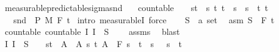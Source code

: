 \begin{isabellebody}
\endisatagproof
{\isafoldproof}%
%
\isadelimproof
\isanewline
%
\endisadelimproof
\isanewline
{}\isamarkupfalse%
\ measurable{\isacharunderscore}{\kern0pt}predictable{\isacharunderscore}{\kern0pt}sigma{\isacharunderscore}{\kern0pt}snd{\isacharcolon}{\kern0pt}\isanewline
\ \ \ {\isachardoublequoteopen}countable\ {\isasymI}{\isachardoublequoteclose}\ {\isachardoublequoteopen}{\isasymI}\ {\isasymsubseteq}\ {\isacharbraceleft}{\kern0pt}{\isacharbraceleft}{\kern0pt}s{\isacharless}{\kern0pt}{\isachardot}{\kern0pt}{\isachardot}{\kern0pt}t{\isacharbraceright}{\kern0pt}\ {\isacharbar}{\kern0pt}\ s\ t{\isachardot}{\kern0pt}\ t\ {\isasymle}\ s\ {\isasymand}\ s\ {\isacharless}{\kern0pt}\ t{\isacharbraceright}{\kern0pt}{\isachardoublequoteclose}\ {\isachardoublequoteopen}{\isacharbraceleft}{\kern0pt}t\ {\isasymsubseteq}\ {\isacharparenleft}{\kern0pt}{\isasymUnion}{\isasymI}{\isacharparenright}{\kern0pt}{\isachardoublequoteclose}\isanewline
\ \ \ {\isachardoublequoteopen}snd\ {\isasymin}\ {\isasymSigma}\isactrlsub P\ {\isasymrightarrow}\isactrlsub M\ F\ t\isanewline
%
\isadelimproof
%
\endisadelimproof
%
\isatagproof
{}\isamarkupfalse%
\ {\isacharparenleft}{\kern0pt}intro\ measurableI{\isacharcomma}{\kern0pt}\ force{\isacharparenright}{\kern0pt}\isanewline
\ \ \isamarkupfalse%
\ S\ {\isacharcolon}{\kern0pt}{\isacharcolon}{\kern0pt}\ {\isachardoublequoteopen}{\isacharprime}{\kern0pt}a\ set{\isachardoublequoteclose}\ \isamarkupfalse%
\ asm{\isacharcolon}{\kern0pt}\ {\isachardoublequoteopen}S\ {\isasymin}\ F\ t\isanewline
\ \ \isamarkupfalse%
\ countable{\isacharcolon}{\kern0pt}\ {\isachardoublequoteopen}countable\ {\isacharparenleft}{\kern0pt}{\isacharparenleft}{\kern0pt}{\isasymlambda}I{\isachardot}{\kern0pt}\ I\ {\isasymtimes}\ S{\isacharparenright}{\kern0pt}\ {\isacharbackquote}{\kern0pt}\ {\isasymI}{\isacharparenright}{\kern0pt}{\isachardoublequoteclose}\ \isamarkupfalse%
\ assms{\isacharparenleft}{\kern0pt}{}{\isacharparenright}{\kern0pt}\ \isamarkupfalse%
\ blast\isanewline
\ \ \isamarkupfalse%
\ {\isachardoublequoteopen}{\isacharparenleft}{\kern0pt}{\isasymlambda}I{\isachardot}{\kern0pt}\ I\ {\isasymtimes}\ S{\isacharparenright}{\kern0pt}\ {\isacharbackquote}{\kern0pt}\ {\isasymI}\ {\isasymsubseteq}\ {\isacharbraceleft}{\kern0pt}{\isacharbraceleft}{\kern0pt}s{\isacharless}{\kern0pt}{\isachardot}{\kern0pt}{\isachardot}{\kern0pt}t{\isacharbraceright}{\kern0pt}\ {\isasymtimes}\ A\ {\isacharbar}{\kern0pt}\ A\ s\ t{\isachardot}{\kern0pt}\ A\ {\isasymin}\ F\ s\ {\isasymand}\ t\ {\isasymle}\ s\ {\isasymand}\ \ s\ {\isacharless}{\kern0pt}\ t{\isacharbraceright}{\kern0pt}{\isachardoublequoteclose}\ \isamarkupfalse%

\end{isabellebody}
